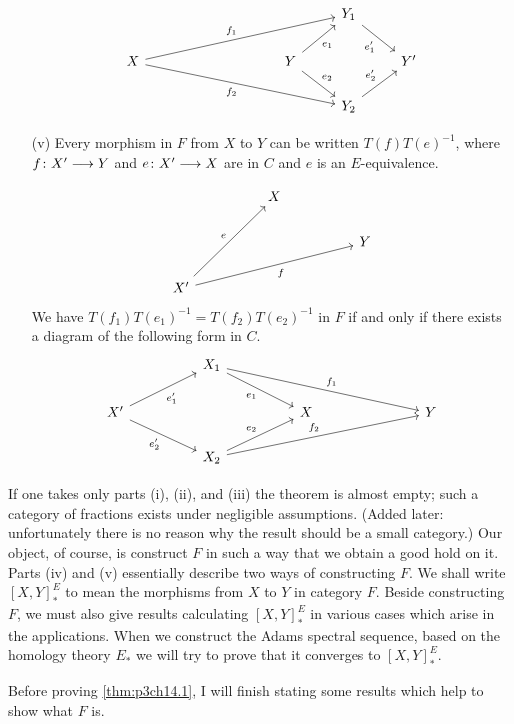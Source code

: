 \documentclass[../main]{subfiles}
\begin{document}
\begin{theorem}
\begin{enumerate}[label=(\roman*)]
\[\begin{tikzcd}
	&&&&& {Y_1} \\
	X &&&& Y && {Y'} \\
	&&&&& {Y_2}
	\arrow["{f_1}", from=2-1, to=1-6]
	\arrow["{f_2}"', from=2-1, to=3-6]
	\arrow["{e_1}"', from=2-5, to=1-6]
	\arrow["{e'_1}"', from=1-6, to=2-7]
	\arrow["{e'_2}", from=3-6, to=2-7]
	\arrow["{e_2}", from=2-5, to=3-6]
\end{tikzcd}\]
\item [(v)] Every morphism in $F$ from $X$ to $Y$ can be written  $T (f)T (e)^{-1}$, where $f\colon X' \lar{} Y  $ and $e\colon X' \lar{} X  $ are in $C$ and  $e$ is an $E$-equivalence.
\[\begin{tikzcd}
	&& X \\
	&&&& Y \\
	{X'}
	\arrow["e", from=3-1, to=1-3]
	\arrow["f"', from=3-1, to=2-5]
\end{tikzcd}\]
We have $T (f_1)T (e_1)^{-1} =T (f_2)T (e_2)^{-1}$ in $F$ if and only if there exists a diagram of the following form in $C$. 
\[\begin{tikzcd}
	&& {X_1} \\
	{X'} &&&& X &&& Y \\
	&& {X_2}
	\arrow["{e'_1}"', from=2-1, to=1-3]
	\arrow["{e'_2}"', from=2-1, to=3-3]
	\arrow["{e_1}"', from=1-3, to=2-5]
	\arrow["{e_2}", from=3-3, to=2-5]
	\arrow["{f_1}", from=1-3, to=2-8]
	\arrow["{f_2}", from=3-3, to=2-8]
\end{tikzcd}\]
\end{enumerate}
\end{theorem}


If one takes only parts (i), (ii), and (iii) the theorem is almost empty; such a category of fractions exists under negligible assumptions. (Added later: unfortunately there is no reason why the result should be a small category.) Our object, of course, is construct $F$ in such a way that we obtain a good hold on it. Parts (iv) and (v) essentially describe two ways of constructing $F$. We shall write  $\left[ X,Y \right] _{\ast}^E$ to mean the morphisms from $X$ to $Y$ in category $F$. Beside constructing  $F$, we must also give results calculating  $\left[ X,Y \right] _{\ast}^E$ in various cases which arise in the applications. When we construct the Adams spectral sequence, based on the homology theory $E_{\ast}$ we will try to prove that it converges to  $\left[ X,Y \right] _{\ast}^E$.

Before proving \ref{thm:p3ch14.1}, I will finish stating some results which help to show what $F$ is. 
\end{document}
